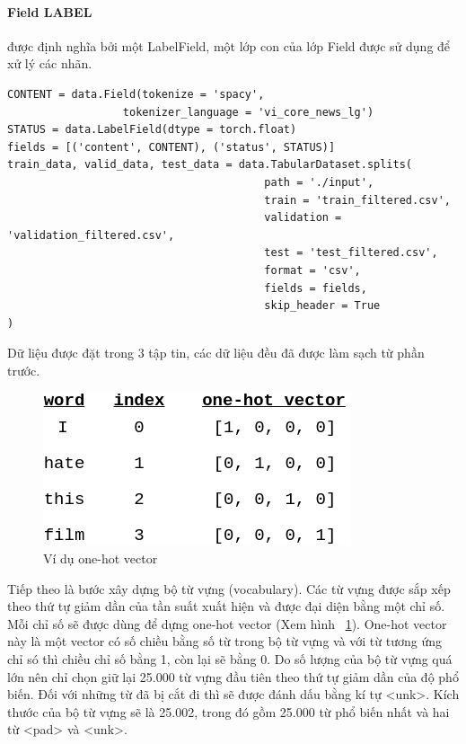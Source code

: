 \documentclass[runningheads]{llncs}
\begin{document}
\paragraph{Field LABEL} được định nghĩa bởi một LabelField, một lớp con của lớp Field được sử dụng để xử lý các nhãn.

\begin{lstlisting}
CONTENT = data.Field(tokenize = 'spacy',
                  tokenizer_language = 'vi_core_news_lg')
STATUS = data.LabelField(dtype = torch.float)
fields = [('content', CONTENT), ('status', STATUS)]
train_data, valid_data, test_data = data.TabularDataset.splits(
                                        path = './input',
                                        train = 'train_filtered.csv',
                                        validation = 'validation_filtered.csv',
                                        test = 'test_filtered.csv',
                                        format = 'csv',
                                        fields = fields,
                                        skip_header = True
)
\end{lstlisting}

Dữ liệu được đặt trong 3 tập tin, các dữ liệu đều đã được làm sạch từ phần trước.

\begin{figure}
\includegraphics[scale=0.5]{sentiment5.png}
\centering
\caption{Ví dụ one-hot vector \label{figOnehotVector}}
\end{figure}

Tiếp theo là bước xây dựng bộ từ vựng (vocabulary). Các từ vựng được sắp xếp theo thứ tự giảm dần của tần suất xuất hiện và được đại diện bằng một chỉ số. Mỗi chỉ số sẽ được dùng để dựng one-hot vector (Xem hình ~\ref{figOnehotVector}). One-hot vector này là một vector có số chiều bằng số từ trong bộ từ vựng và với từ tương ứng chỉ só thì chiều chỉ số bằng 1, còn lại sẽ bằng 0. Do số lượng của bộ từ vựng quá lớn nên chỉ chọn giữ lại 25.000 từ vựng đầu tiên theo thứ tự giảm dần của độ phổ biến. Đối với những từ đã bị cắt đi thì sẽ được đánh dấu bằng kí tự <unk>. Kích thước của bộ từ vựng sẽ là 25.002, trong đó gồm 25.000 từ phổ biến nhất và hai từ <pad> và <unk>.
\end{document}
